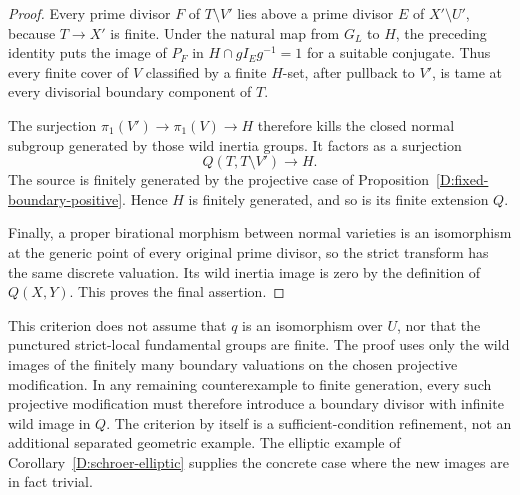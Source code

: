 \begin{proof}
Every prime divisor $F$ of $T\setminus V'$ lies above a prime
divisor $E$ of $X'\setminus U'$, because $T\to X'$ is finite.
Under the natural map from $G_L$ to $H$, the preceding identity
puts the image of $P_F$ in $H\cap gI_Eg^{-1}=1$ for a suitable
conjugate.  Thus every finite cover of $V$ classified by a finite
$H$-set, after pullback to $V'$, is tame at every divisorial
boundary component of $T$.

The surjection $\pi_1(V')\to\pi_1(V)\to H$ therefore kills the
closed normal subgroup generated by those wild inertia groups.
It factors as a surjection
\[
 Q(T,T\setminus V')\longrightarrow H.
\]
The source is finitely generated by the projective case of
Proposition~\ref{D:fixed-boundary-positive}.  Hence $H$ is
finitely generated, and so is its finite extension $Q$.

Finally, a proper birational morphism between normal varieties is
an isomorphism at the generic point of every original prime divisor,
so the strict transform has the same discrete valuation.
Its wild inertia image is zero by the definition of $Q(X,Y)$.
This proves the final assertion.
\end{proof}

\begin{remark}
This criterion does not assume that $q$ is an isomorphism over $U$,
nor that the punctured strict-local fundamental groups are finite.
The proof uses only the wild images of the finitely many boundary
valuations on the chosen projective modification.
In any remaining counterexample to finite generation, every such
projective modification must therefore introduce a boundary divisor
with infinite wild image in $Q$.
The criterion by itself is a sufficient-condition refinement, not
an additional separated geometric example.  The elliptic example
of Corollary~\ref{D:schroer-elliptic} supplies the concrete case
where the new images are in fact trivial.
\end{remark}
